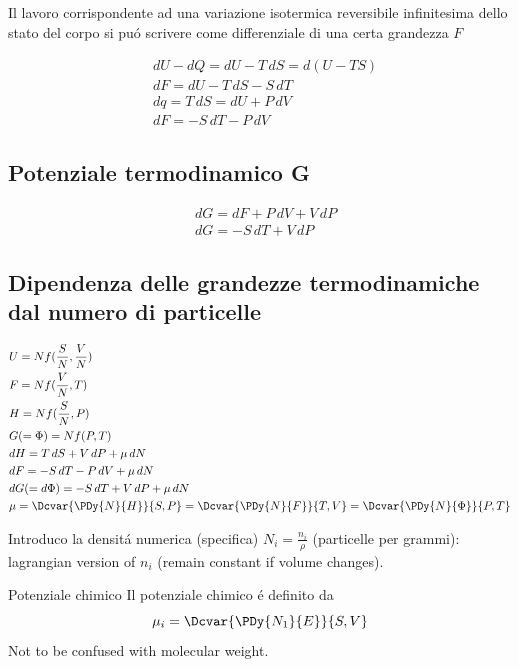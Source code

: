 Il lavoro corrispondente ad una variazione isotermica reversibile infinitesima dello stato del corpo si pu\'o scrivere come differenziale di una certa grandezza $F$

\begin{align*}
&dU-dQ=dU-T\,dS=d(U-TS)\\
&dF=dU-T\,dS-S\,dT\\
&dq=T\,dS=dU+P\,dV\\
&dF=-S\,dT-P\,dV
\end{align*}

\subsection{Potenziale termodinamico G}

\begin{align*}
&dG=dF+P\,dV+V\,dP\\
&dG=-S\,dT+V\,dP
\end{align*}

\subsection{Dipendenza delle grandezze termodinamiche dal numero di particelle}

\begin{align*}
&U=Nf(\frac{S}{N},\frac{V}{N})\\
&F=Nf(\frac{V}{N},T)\\
&H=Nf(\frac{S}{N},P)\\
&G(=\Phi)=Nf(P,T)\\
&dH=T\,dS+V\,dP+\mu\,dN\\
&dF=-S\,dT-P\,dV+\mu\,dN\\
&dG(=d\Phi)=-S\,dT+V\,dP+\mu\,dN\\
&\mu=\Dcvar{\PDy{N}{H}}{S,P}=\Dcvar{\PDy{N}{F}}{T,V}=\Dcvar{\PDy{N}{\Phi}}{P,T}
\end{align*}

Introduco la densit\'a numerica (specifica) $N_i=\frac{n_i}{\rho}$ (particelle per grammi): lagrangian version of $n_i$ (remain constant if volume changes).

\begin{definition}{Potenziale chimico}
Il potenziale chimico \'e definito da
\begin{equation*}
\mu_i=\Dcvar{\PDy{N_1}{E}}{S,V}
\end{equation*}
Not to be confused with molecular weight.
\end{definition}

